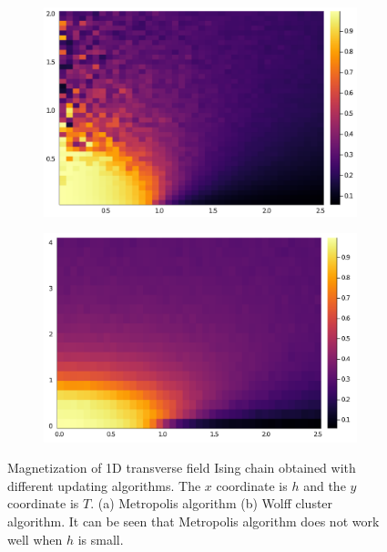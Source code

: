\documentclass[hyperref, a4paper]{article}
\begin{document}
\begin{figure}
    \centering
    \begin{subfigure}{0.45\textwidth}
        \centering
        \includegraphics[width=\textwidth]{phase/phase-diagram-transverse-ising-metropolis.PNG}
        \subcaption{}
    \end{subfigure}
    \begin{subfigure}{0.45\textwidth}
        \centering
        \includegraphics[width=\textwidth]{phase/phase-diagram-transverse-ising-wolff.PNG}
        \subcaption{}
    \end{subfigure}
    \caption{Magnetization of 1D transverse field Ising chain obtained with different updating algorithms. The $x$ coordinate is $h$ and the $y$ coordinate is $T$. (a) Metropolis algorithm (b) Wolff cluster algorithm. 
    It can be seen that Metropolis algorithm does not work well when $h$ is small.}
    \label{fig:comparision-metropolis-wolff}
\end{figure}
\end{document}
